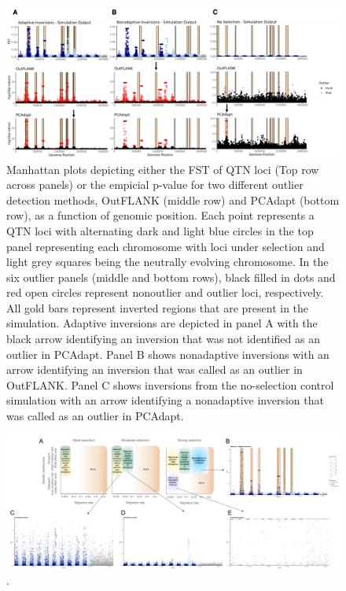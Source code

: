 \documentclass[10pt, oneside]{amsart}
\begin{document}
\begin{figure}[h]
	\begin{center}
		\includegraphics[width = 6.5 in]{Fig4_outlierExamples.pdf}
	\end{center}
	\caption[Outlier Examples]{Manhattan plots depicting either the FST of QTN loci (Top row across panels) or the empicial p-value for two different outlier detection methods, OutFLANK (middle row) and PCAdapt (bottom row), as a function of genomic position. Each point represents a QTN loci with alternating dark and light blue circles in the top panel representing each chromosome with loci under selection and light grey squares being the neutrally evolving chromosome. In the six outlier panels (middle and bottom rows), black filled in dots and red open circles represent nonoutlier and outlier loci, respectively. All gold bars represent inverted regions that are present in the simulation. Adaptive inversions are depicted in panel A with the black arrow identifying an inversion that was not identified as an outlier in PCAdapt. Panel B shows nonadaptive inversions with an arrow identifying an inversion that was called as an outlier in OutFLANK. Panel C shows inversions from the no-selection control simulation with an arrow identifying a nonadaptive inversion that was called as an outlier in PCAdapt.}
\end{figure}

\clearpage
\newpage


\begin{figure}[h]
	\begin{center}
		\includegraphics[width = 6.5 in]{Conceptual_with_manh.pdf}
	\end{center}
	\caption[ConceptualDiagram]{.}
\end{figure}
\end{document}
